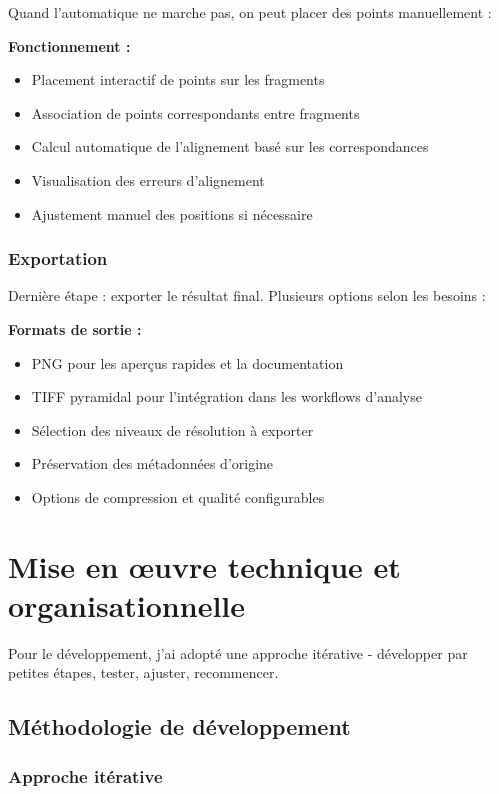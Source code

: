 \documentclass[11pt,a4paper]{report}
\begin{document}
Quand l'automatique ne marche pas, on peut placer des points manuellement :

\textbf{Fonctionnement :}
\begin{itemize}
\item Placement interactif de points sur les fragments
\item Association de points correspondants entre fragments
\item Calcul automatique de l'alignement basé sur les correspondances
\item Visualisation des erreurs d'alignement
\item Ajustement manuel des positions si nécessaire
\end{itemize}

\subsubsection{Exportation}

Dernière étape : exporter le résultat final. Plusieurs options selon les besoins :

\textbf{Formats de sortie :}
\begin{itemize}
\item PNG pour les aperçus rapides et la documentation
\item TIFF pyramidal pour l'intégration dans les workflows d'analyse
\item Sélection des niveaux de résolution à exporter
\item Préservation des métadonnées d'origine
\item Options de compression et qualité configurables
\end{itemize}

\section{Mise en œuvre technique et organisationnelle}

Pour le développement, j'ai adopté une approche itérative - développer par petites étapes, tester, ajuster, recommencer.

\subsection{Méthodologie de développement}

\subsubsection{Approche itérative}
\end{document}
